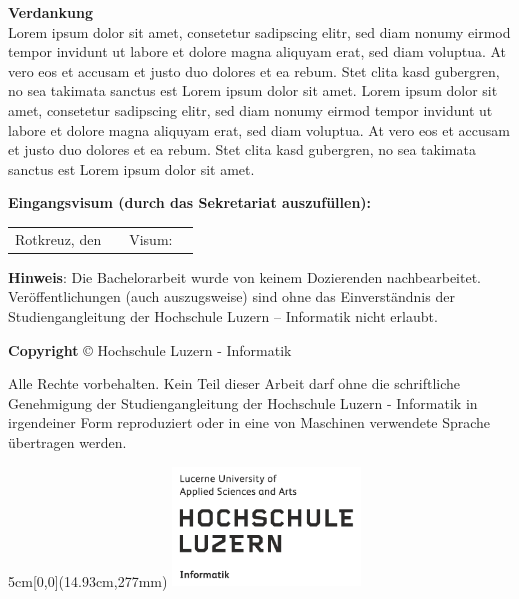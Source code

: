 \vspace{0.8cm}
\noindent
\textbf{Verdankung}
\\
Lorem ipsum dolor sit amet, consetetur sadipscing elitr, sed diam nonumy eirmod tempor invidunt ut labore et dolore magna aliquyam erat, sed diam voluptua. At vero eos et accusam et justo duo dolores et ea rebum. Stet clita kasd gubergren, no sea takimata sanctus est Lorem ipsum dolor sit amet. Lorem ipsum dolor sit amet, consetetur sadipscing elitr, sed diam nonumy eirmod tempor invidunt ut labore et dolore magna aliquyam erat, sed diam voluptua. At vero eos et accusam et justo duo dolores et ea rebum. Stet clita kasd gubergren, no sea takimata sanctus est Lorem ipsum dolor sit amet.

\vspace{0.8cm}
\noindent
\textbf{Eingangsvisum (durch das Sekretariat auszufüllen):}

\noindent
\renewcommand{\arraystretch}{2}
\begin{tabularx}{\textwidth}{@{}lXlX}
	Rotkreuz, den & & Visum: & \\
	\cline{2-2}
	\cline{4-4}
\end{tabularx}
\renewcommand{\arraystretch}{1}

\vfill
\noindent
\textbf{Hinweis}: Die Bachelorarbeit wurde von keinem Dozierenden nachbearbeitet. Veröffentlichungen (auch auszugsweise) sind ohne das Einverständnis der Studiengangleitung der Hochschule Luzern – Informatik nicht erlaubt.

\vspace{1em}

\noindent
\textbf{Copyright} © \the\year{} Hochschule Luzern - Informatik

\vspace{1em}
\noindent
Alle Rechte vorbehalten. Kein Teil dieser Arbeit darf ohne die schriftliche Genehmigung der Studiengangleitung der Hochschule Luzern - Informatik in irgendeiner Form reproduziert oder in eine von Maschinen verwendete Sprache übertragen werden.


\begin{textblock*}{5cm}[0,0](14.93cm,277mm)
	\includegraphics[keepaspectratio,width=5cm]{img/HSLU_Logo}
\end{textblock*}

